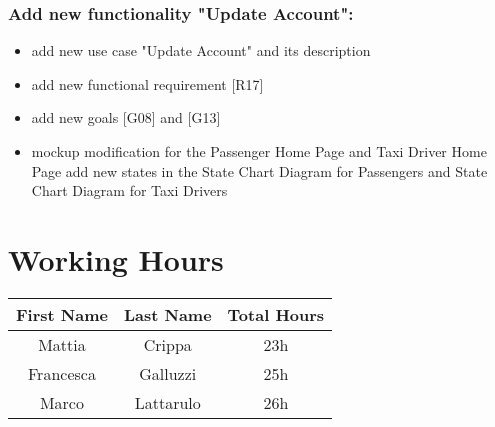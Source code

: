 \subsubsection{Add new functionality "Update Account":}
\begin{itemize}
	\item add new use case "Update Account" and its description
	\item add new functional requirement [R17]
	\item add new goals [G08] and [G13]
	\item mockup modification for the Passenger Home Page and Taxi Driver Home Page
add new states in the State Chart Diagram for Passengers and State Chart Diagram for Taxi Drivers
\end{itemize}

\section{Working Hours}

\begin{table}[htbp]
\begin{center}
\begin{tabular}[t]{ccc}

\hline
\textbf{First Name} & \textbf{Last Name} & \textbf{Total Hours} \\
\hline
Mattia & Crippa &  23h\\
\hline
Francesca & Galluzzi &  25h\\
\hline
Marco & Lattarulo & 26h\\
\hline

\end{tabular}
\end{center}
\end{table}
